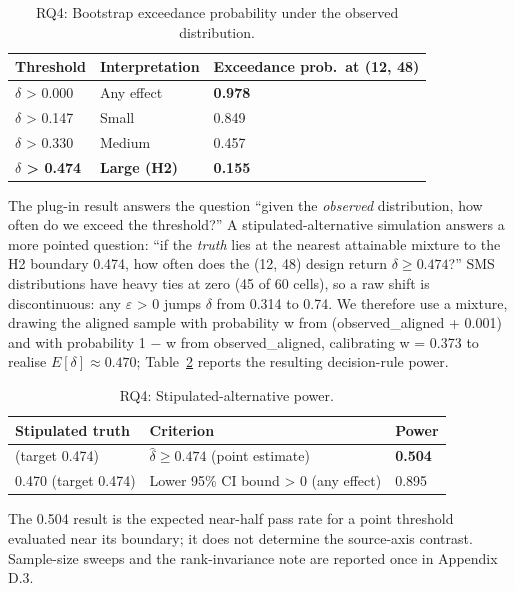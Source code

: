 \documentclass[manuscript,screen,review]{acmart}
\begin{document}
{%
\begin{longtable}[]{@{}lll@{}}
\caption{RQ4: Bootstrap exceedance probability under the observed
distribution.}\label{tab:rq4-observed-exceedance}\\
\toprule\noalign{}
Threshold & Interpretation & Exceedance prob.\ at (12, 48) \\
\midrule\noalign{}
\endhead
\bottomrule\noalign{}
\endlastfoot
$\delta$ \textgreater{} 0.000 & Any effect & \textbf{0.978} \\
$\delta$ \textgreater{} 0.147 & Small & 0.849 \\
$\delta$ \textgreater{} 0.330 & Medium & 0.457 \\
\textbf{$\delta$ \textgreater{} 0.474} & \textbf{Large (H2)} &
\textbf{0.155} \\
\end{longtable}
}

The plug-in result answers the question ``given the \emph{observed}
distribution, how often do we exceed the threshold?'' A
stipulated-alternative simulation answers a more pointed question: ``if
the \emph{truth} lies at the nearest attainable mixture to the H2
boundary 0.474, how often does the (12,
48) design return $\delta \geq 0.474$?'' SMS distributions have heavy ties at zero
(45 of 60 cells), so a raw shift is discontinuous: any $\varepsilon$ \textgreater{}
0 jumps $\delta$ from 0.314 to 0.74. We therefore use a mixture, drawing the
aligned sample with probability w from (observed\_aligned + 0.001) and
with probability 1 $-$ w from observed\_aligned, calibrating w = 0.373 to
realise $E[\delta] \approx 0.470$; Table~\ref{tab:p2-11} reports the
resulting decision-rule power.

{%
\begin{longtable}[]{@{}lll@{}}
\caption{RQ4: Stipulated-alternative power.}\label{tab:p2-11}\\
\toprule\noalign{}
Stipulated truth & Criterion & Power \\
\midrule\noalign{}
\endfirsthead
\endhead
\bottomrule\noalign{}
\endlastfoot
0.470 (target 0.474) & $\hat{\delta} \geq 0.474$ (point estimate) & \textbf{0.504} \\
0.470 (target 0.474) & Lower 95\% CI bound \textgreater{} 0 (any effect) & 0.895 \\
\end{longtable}
}

The 0.504 result is the expected near-half pass rate for a point
threshold evaluated near its boundary; it does not determine the
source-axis contrast. Sample-size sweeps and the rank-invariance note
are reported once in Appendix D.3.
\end{document}
